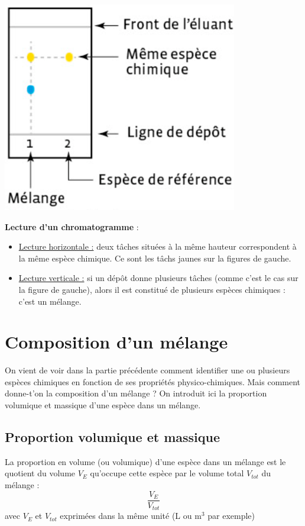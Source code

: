 \begin{minipage}[c]{0.4\textwidth}
    \includegraphics{Images/Chapitre_1/CCM.png}
\end{minipage}
\begin{minipage}[c]{0.6\textwidth}
    \textbf{Lecture d'un chromatogramme} :
    \begin{itemize}
        \item \underline{Lecture horizontale :} deux tâches situées à la même hauteur correspondent à la même espèce chimique. Ce sont les tâchs jaunes sur la figures de gauche.
        \item  \underline{Lecture verticale :} si un dépôt donne plusieurs tâches (comme c'est le cas sur la figure de gauche), alors il est constitué de plusieurs espèces chimiques : c’est un mélange.
    \end{itemize}
\end{minipage}

\section{Composition d'un mélange}
On vient de voir dans la partie précédente comment identifier une ou plusieurs espèces chimiques en fonction de ses propriétés physico-chimiques. Mais comment donne-t'on la composition d'un mélange ? On introduit ici la proportion volumique et massique d'une espèce dans un mélange.

\subsection{Proportion volumique et massique}

\begin{tcolorbox}[colback=green!5!white,colframe=green!75!black,title=\textbf{Proportion volumique}]
La proportion en volume (ou volumique) d'une espèce dans un mélange est le quotient du volume $V_{E}$ qu'occupe cette espèce par le volume total $V_{tot}$ du mélange :
\begin{equation*}
    \frac{V_E}{V_{tot}}
\end{equation*}
avec $V_{E}$ et $V_{tot}$ exprimées dans la même unité (L ou m$^3$ par exemple)
\end{tcolorbox}

